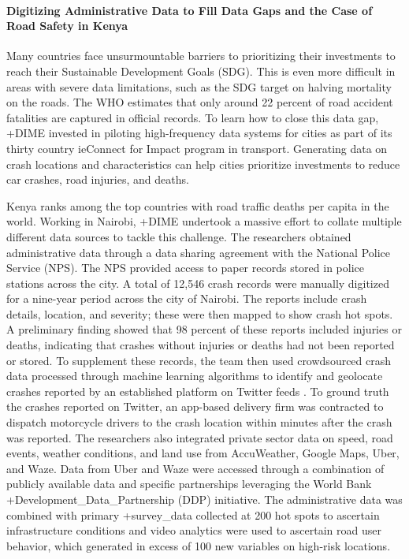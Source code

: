\documentclass[
]{WileySix}
\begin{document}
\hypertarget{digitizing-administrative-data-to-fill-data-gaps-and-the-case-of-road-safety-in-kenya}{%
\paragraph{Digitizing Administrative Data to Fill Data Gaps and the Case of Road Safety in Kenya}\label{digitizing-administrative-data-to-fill-data-gaps-and-the-case-of-road-safety-in-kenya}}

Many countries face unsurmountable barriers to prioritizing their investments to reach their Sustainable Development Goals (SDG). This is even more difficult in areas with severe data limitations, such as the SDG target on halving mortality on the roads. The WHO estimates that only around 22 percent of road accident fatalities are captured in official records. To learn how to close this data gap, +DIME\textbar{} invested in piloting high-frequency data systems for cities as part of its thirty country ieConnect for Impact program in transport. Generating data on crash locations and characteristics can help cities prioritize investments to reduce car crashes, road injuries, and deaths.

Kenya ranks among the top countries with road traffic deaths per capita in the world. Working in Nairobi, +DIME\textbar{} undertook a massive effort to collate multiple different data sources to tackle this challenge. The researchers obtained administrative data through a data sharing agreement with the National Police Service (NPS). The NPS provided access to paper records stored in police stations across the city. A total of 12,546 crash records were manually digitized for a nine-year period across the city of Nairobi. The reports include crash details, location, and severity; these were then mapped to show crash hot spots. A preliminary finding showed that 98 percent of these reports included injuries or deaths, indicating that crashes without injuries or deaths had not been reported or stored. To supplement these records, the team then used crowdsourced crash data processed through machine learning algorithms to identify and geolocate crashes reported by an established platform on Twitter feeds \citep{milusheva2020}. To ground truth the crashes reported on Twitter, an app-based delivery firm was contracted to dispatch motorcycle drivers to the crash location within minutes after the crash was reported. The researchers also integrated private sector data on speed, road events, weather conditions, and land use from AccuWeather, Google Maps, Uber, and Waze. Data from Uber and Waze were accessed through a combination of publicly available data and specific partnerships leveraging the World Bank +Development\_Data\_Partnership\textbar{} (DDP) initiative. The administrative data was combined with primary +survey\_data\textbar{} collected at 200 hot spots to ascertain infrastructure conditions and video analytics were used to ascertain road user behavior, which generated in excess of 100 new variables on high-risk locations.
\end{document}

